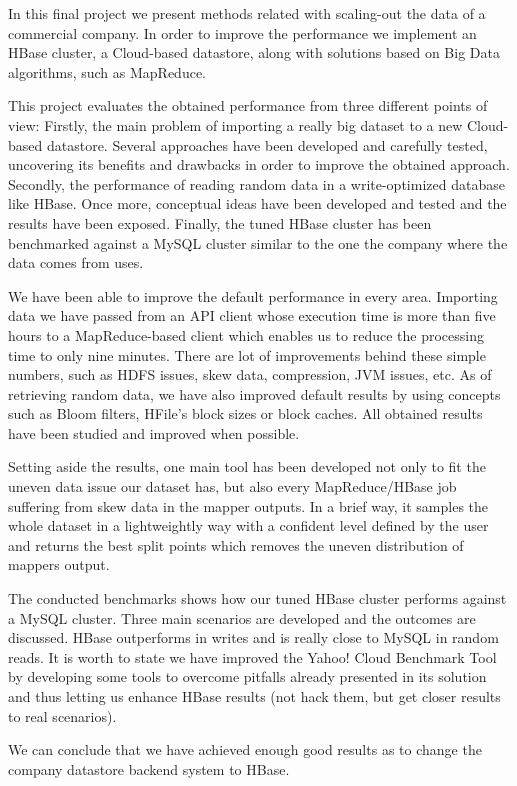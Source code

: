 In this final project we present methods related with scaling-out the data of a commercial company. In order to improve the performance we implement an HBase cluster, a Cloud-based datastore, along with solutions based on Big Data algorithms, such as MapReduce.
\par
This project evaluates the obtained performance from three different points of view: Firstly, the main problem of importing a really big dataset to a new Cloud-based datastore. Several approaches have been developed and carefully tested, uncovering its benefits and drawbacks in order to improve the obtained approach. Secondly,  the performance of reading random data in a write-optimized database like HBase. Once more, conceptual ideas have been developed and tested and the results have been exposed. Finally, the tuned HBase cluster has been benchmarked against a MySQL cluster similar to the one the company where the data comes from uses.
\par
We have been able to improve the default performance in every area. Importing data we have passed from an API client whose execution time is more than five hours to a MapReduce-based client which enables us to reduce the processing time to only nine minutes. There are lot of improvements behind these simple numbers, such as HDFS issues, skew data, compression, JVM issues, etc. As of retrieving random data, we have also improved default results by using concepts such as Bloom filters, HFile's block sizes or block caches. All obtained results have been studied and improved when possible.
\par
Setting aside the results, one main tool has been developed not only to fit the uneven data issue our dataset has, but also every MapReduce/HBase job suffering from skew data in the mapper outputs. In a brief way, it samples the whole dataset in a lightweightly way with a confident level defined by the user and returns the best split points which removes the uneven distribution of mappers output.  
\par
The conducted benchmarks shows how our tuned HBase cluster performs against a MySQL cluster. Three main scenarios are developed and the outcomes are discussed. HBase outperforms in writes and is really close to MySQL in random reads. It is worth to state we have improved the Yahoo! Cloud Benchmark Tool by developing some tools to overcome pitfalls already presented in its solution and thus letting us enhance HBase results (not hack them, but get closer results to real scenarios).
\par
We can conclude that we have achieved enough good results as to change the company datastore backend system to HBase.

